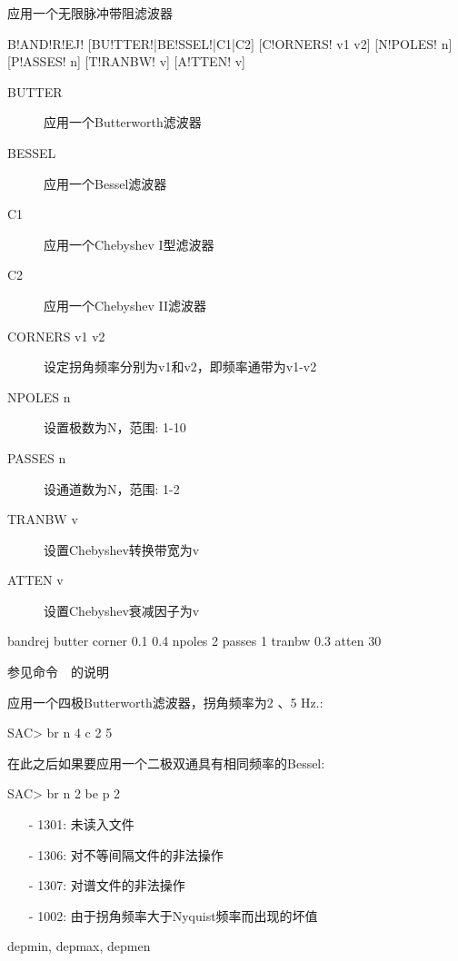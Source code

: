 \label{cmd:bandrej}

应用一个无限脉冲带阻滤波器

\begin{SACSTX}
B!AND!R!EJ! [BU!TTER!|BE!SSEL!|C1|C2] [C!ORNERS! v1 v2] [N!POLES! n] [P!ASSES! n]
    [T!RANBW! v] [A!TTEN! v]
\end{SACSTX}

\begin{description}
\item [BUTTER] 应用一个Butterworth滤波器
\item [BESSEL] 应用一个Bessel滤波器
\item [C1] 应用一个Chebyshev I型滤波器
\item [C2] 应用一个Chebyshev II滤波器
\item [CORNERS v1 v2] 设定拐角频率分别为v1和v2，即频率通带为v1-v2
\item [NPOLES n] 设置极数为N，范围: 1-10
\item [PASSES n] 设通道数为N，范围: 1-2
\item [TRANBW v] 设置Chebyshev转换带宽为v
\item [ATTEN v] 设置Chebyshev衰减因子为v
\end{description}

\begin{SACDFT}
bandrej butter corner 0.1 0.4 npoles 2 passes 1 tranbw 0.3 atten 30
\end{SACDFT}

参见命令~~的说明

应用一个四极Butterworth滤波器，拐角频率为2 、5 Hz.:
\begin{SACCode}
SAC> br n 4 c 2 5
\end{SACCode}

在此之后如果要应用一个二极双通具有相同频率的Bessel:
\begin{SACCode}
SAC> br n 2 be p 2
\end{SACCode}

\begin{itemize}
\item[-]1301: 未读入文件
\item[-]1306: 对不等间隔文件的非法操作
\item[-]1307: 对谱文件的非法操作
\item[-]1002: 由于拐角频率大于Nyquist频率而出现的坏值
\end{itemize}

depmin, depmax, depmen

